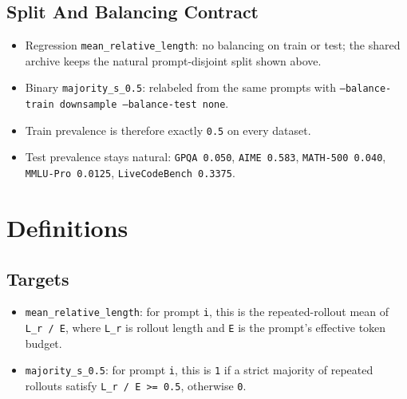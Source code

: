 \documentclass[11pt]{article}
\begin{document}
\begin{center}
\small
\setlength{\tabcolsep}{4pt}
\end{center}

\subsection*{Split And Balancing Contract}
\begin{itemize}[leftmargin=1.5em]
\item Regression \texttt{mean\_relative\_length}: no balancing on train or test; the shared archive keeps the natural prompt-disjoint split shown above.
\item Binary \texttt{majority\_s\_0.5}: relabeled from the same prompts with \texttt{--balance-train downsample --balance-test none}.
\item Train prevalence is therefore exactly \texttt{0.5} on every dataset.
\item Test prevalence stays natural: \texttt{GPQA 0.050}, \texttt{AIME 0.583}, \texttt{MATH-500 0.040}, \texttt{MMLU-Pro 0.0125}, \texttt{LiveCodeBench 0.3375}.
\end{itemize}

\section*{Definitions}
\subsection*{Targets}
\begin{itemize}[leftmargin=1.5em]
\item \texttt{mean\_relative\_length}: for prompt \texttt{i}, this is the repeated-rollout mean of \texttt{L\_r / E}, where \texttt{L\_r} is rollout length and \texttt{E} is the prompt's effective token budget.
\item \texttt{majority\_s\_0.5}: for prompt \texttt{i}, this is \texttt{1} if a strict majority of repeated rollouts satisfy \texttt{L\_r / E >= 0.5}, otherwise \texttt{0}.
\end{itemize}
\end{document}
